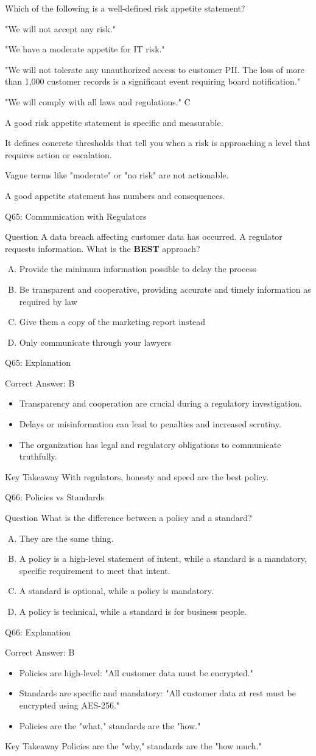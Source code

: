 \documentclass[aspectratio=169]{beamer}
\newcommand{\hq}[7]{%
	\begin{frame}{Q#1: #2}
		\begin{block}{Question}
			#3
		\end{block}
		\begin{enumerate}[(A)]
			#4
		\end{enumerate}
	\end{frame}
	\begin{frame}{Q#1: Explanation}
		\begin{block}{Correct Answer: #5}
			\begin{itemize}
				#6
			\end{itemize}
		\end{block}
		\begin{alertblock}{Key Takeaway}
			#7
		\end{alertblock}
	\end{frame}
}
\begin{document}
	{Which of the following is a well-defined risk appetite statement?}
	{\item "We will not accept any risk."
		\item "We have a moderate appetite for IT risk."
		\item "We will not tolerate any unauthorized access to customer PII. The loss of more than 1,000 customer records is a significant event requiring board notification."
		\item "We will comply with all laws and regulations."
		{C}
		{\item A good risk appetite statement is specific and measurable.
			\item It defines concrete thresholds that tell you when a risk is approaching a level that requires action or escalation.
			\item Vague terms like "moderate" or "no risk" are not actionable.}
		{A good appetite statement has numbers and consequences.}
		
		\hq{65}{Communication with Regulators}
		{A data breach affecting customer data has occurred. A regulator requests information. What is the \textbf{BEST} approach?}
		{\item Provide the minimum information possible to delay the process
			\item Be transparent and cooperative, providing accurate and timely information as required by law
			\item Give them a copy of the marketing report instead
			\item Only communicate through your lawyers}
		{B}
		{\item Transparency and cooperation are crucial during a regulatory investigation.
			\item Delays or misinformation can lead to penalties and increased scrutiny.
			\item The organization has legal and regulatory obligations to communicate truthfully.}
		{With regulators, honesty and speed are the best policy.}
		
		\hq{66}{Policies vs Standards}
		{What is the difference between a policy and a standard?}
		{\item They are the same thing.
			\item A policy is a high-level statement of intent, while a standard is a mandatory, specific requirement to meet that intent.
			\item A standard is optional, while a policy is mandatory.
			\item A policy is technical, while a standard is for business people.}
		{B}
		{\item Policies are high-level: "All customer data must be encrypted."
			\item Standards are specific and mandatory: "All customer data at rest must be encrypted using AES-256."
			\item Policies are the "what," standards are the "how."}
		{Policies are the "why," standards are the "how much."}
		
}
\end{document}
